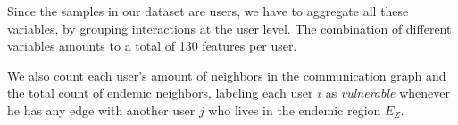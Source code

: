 
Since the samples in our dataset are users, we have to aggregate all these variables, by grouping interactions at the user level. The combination of different variables amounts to a total of 130 features per user.
 
%
%		
%




We also count each user's amount of neighbors in the communication graph and the total count of endemic neighbors, labeling each user $i$ as \textit{vulnerable} whenever he has any edge with another user $j$ who lives in the endemic region $E_Z$. 



